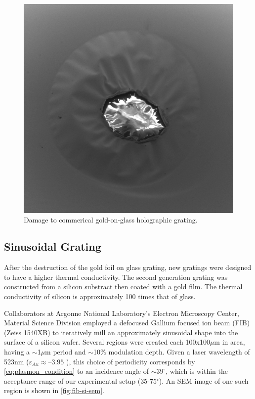 \begin{figure}
  \centering
  \includegraphics{damage.png}
  \caption{Damage to commerical gold-on-glass holographic grating.}
  \label{fig:grating-damage}
\end{figure}

\subsection{Sinusoidal Grating}

After the destruction of the gold foil on glass grating, new gratings were designed to have a higher thermal conductivity.
The second generation grating was constructed from a silicon substract then coated with a gold film.
The thermal conductivity of silicon is approximately 100 times that of glass. %

Collaborators at Argonne National Laboratory's Electron Microscopy Center, Material Science Division employed a defocused Gallium focused ion beam (FIB) (Zeiss 1540XB) to iteratively mill an approximately sinusoidal shape into the surface of a silicon wafer.
Several regions were created each 100x100$\mu$m in area, having a $\sim$1$\mu$m period and $\sim$10\% modulation depth.
Given a laser wavelength of 523nm ($\varepsilon_{Au} \approx –3.95$ \cite{johnson_optical_1972}), this choice of periodicity corresponds by \ref{eq:plasmon_condition} to an incidence angle of $\sim39^{\circ}$, which is within the acceptance range of our experimental setup (35-75$^{\circ}$). %
An SEM image of one such region is shown in \ref{fig:fib-si-sem}.

